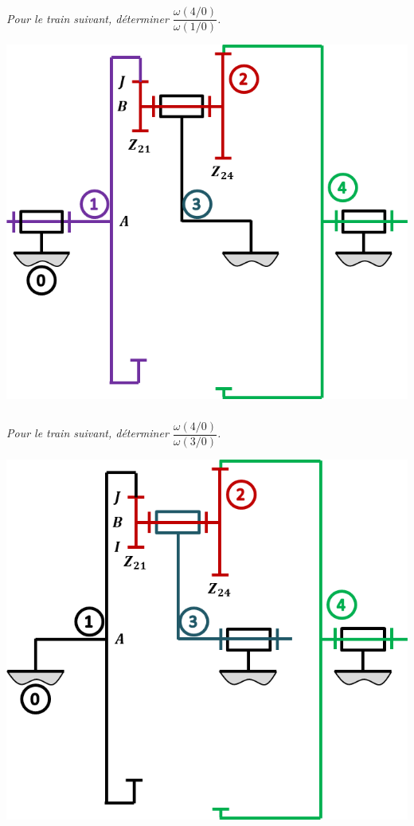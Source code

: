 \documentclass[10pt,fleqn]{article} %
\begin{document}
\begin{multicols}{2}
\subparagraph{}\textit{Pour le train suivant, déterminer $\dfrac{\omega(4/0)}{\omega(1/0)}$.}
\begin{center}
\includegraphics[width=\linewidth]{images/train_03_a}
\end{center}

\subparagraph{}\textit{Pour le train suivant, déterminer $\dfrac{\omega(4/0)}{\omega(3/0)}$.}
\begin{center}
\includegraphics[width=\linewidth]{images/train_03_b}
\end{center}


\end{multicols}
\end{document}
